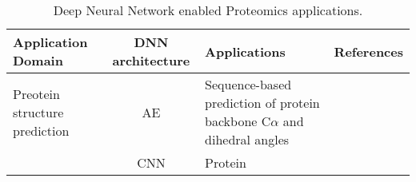 \begin{table}[h!]
\centering
\begin{tabular}{|| l | c | l | l ||}
    \hline
    Application Domain & DNN architecture & Applications & References\\
    \hline \hline
    Preotein structure prediction & AE & Sequence-based prediction of protein backbone C$\alpha$ and dihedral angles & \\
    & CNN & Protein \\
    \hline
\end{tabular}
\caption{Deep Neural Network enabled Proteomics applications.}
\label{tab:PS-DNN}
\end{table}